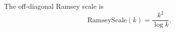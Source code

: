 \begin{definition}
The off-diagonal Ramsey scale is
\[
\mathrm{RamseyScale}(k)=\frac{k^2}{\log k}.
\]
\end{definition}
